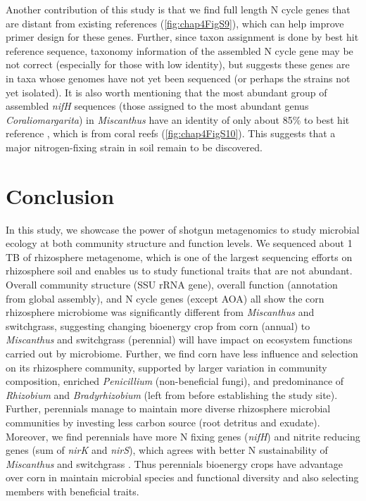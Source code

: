 \documentclass[]{msu-thesis}
\begin{document}
Another contribution of this study is that we find full length N cycle genes
that are distant from existing references (\cref{fig:chap4FigS9}), which can
help improve primer design for these genes. Further, since taxon assignment is
done by best hit reference sequence, taxonomy information of the assembled N
cycle gene may be not correct (especially for those with low identity), but
suggests these genes are in taxa whose genomes have not yet been sequenced (or
perhaps the strains not yet isolated). It is also worth mentioning that the
most abundant group of assembled \textit{nifH} sequences (those assigned to the
most abundant genus \textit{Coraliomargarita}) in \textit{Miscanthus} have an
identity of only about 85\% to best hit reference , which is from coral reefs
(\cref{fig:chap4FigS10}). This suggests that a major nitrogen-fixing strain in
soil remain to be discovered.

\section{Conclusion}

In this study, we showcase the power of shotgun metagenomics to study microbial
ecology at both community structure and function levels. We sequenced about 1
TB of rhizosphere metagenome, which is one of the largest sequencing efforts on
rhizosphere soil and enables us to study functional traits that are not
abundant. Overall community structure (SSU rRNA gene), overall function
(annotation from global assembly), and N cycle genes (except AOA) all show the
corn rhizosphere microbiome was significantly different from
\textit{Miscanthus} and switchgrass, suggesting changing bioenergy crop from
corn (annual) to \textit{Miscanthus} and switchgrass (perennial) will have
impact on ecosystem functions carried out by microbiome. Further, we find corn
have less influence and selection on its rhizosphere community, supported by
larger variation in community composition, enriched \textit{Penicillium}
(non-beneficial fungi), and predominance of \textit{Rhizobium} and
\textit{Bradyrhizobium} (left from before establishing the study site).
Further, perennials manage to maintain more diverse rhizosphere microbial
communities by investing less carbon source (root detritus and exudate).
Moreover, we find perennials have more N fixing genes (\textit{nifH}) and
nitrite reducing genes (sum of \textit{nirK} and \textit{nirS}), which agrees
with better N sustainability of \textit{Miscanthus} and switchgrass
\cite{schwarz_effect_1994,parrish_biology_2005}. Thus perennials bioenergy
crops have advantage over corn in maintain microbial species and functional
diversity and also selecting members with beneficial traits.
\end{document}
